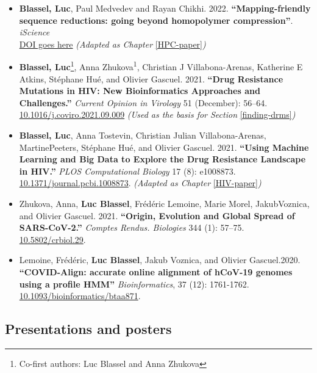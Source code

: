 \documentclass[
  11pt,
  twoside]{scrbook}
\begin{document}
\begin{itemize}
\item
  \textbf{Blassel, Luc}, Paul Medvedev and Rayan Chikhi. 2022. \textbf{``Mapping-friendly sequence reductions: going beyond homopolymer compression''}. \emph{iScience}\\
  \href{https://google.com}{DOI goes here} \emph{(Adapted as Chapter} \ref{HPC-paper}\emph{)}
\item
  \textbf{Blassel, Luc}\footnote{Co-first authors: Luc Blassel and Anna Zhukova}, Anna Zhukova\textsuperscript{1}, Christian J Villabona-Arenas, Katherine E Atkins, Stéphane Hué, and Olivier Gascuel. 2021. \textbf{``Drug Resistance Mutations in HIV: New Bioinformatics Approaches and Challenges.''} \emph{Current Opinion in Virology} 51 (December): 56--64.\\
  \href{https://doi.org/10.1016/j.coviro.2021.09.009}{10.1016/j.coviro.2021.09.009} \emph{(Used as the basis for Section} \ref{finding-drms}\emph{)}
\item
  \textbf{Blassel, Luc}, Anna Tostevin, Christian Julian Villabona-Arenas, MartinePeeters, Stéphane Hué, and Olivier Gascuel. 2021. \textbf{``Using Machine Learning and Big Data to Explore the Drug Resistance Landscape in HIV.''} \emph{PLOS Computational Biology} 17 (8): e1008873.\\
  \href{https://doi.org/10.1371/journal.pcbi.1008873}{10.1371/journal.pcbi.1008873}. \emph{(Adapted as Chapter} \ref{HIV-paper}\emph{)}
\item
  Zhukova, Anna, \textbf{Luc Blassel}, Frédéric Lemoine, Marie Morel, JakubVoznica, and Olivier Gascuel. 2021. \textbf{``Origin, Evolution and Global Spread of SARS-CoV-2.''} \emph{Comptes Rendus. Biologies} 344 (1): 57--75.\\
  \href{https://doi.org/10.5802/crbiol.29}{10.5802/crbiol.29}.
\item
  Lemoine, Frédéric, \textbf{Luc Blassel}, Jakub Voznica, and Olivier Gascuel.2020. \textbf{``COVID-Align: accurate online alignment of hCoV-19 genomes using a profile HMM''} \emph{Bioinformatics}, 37 (12): 1761-1762.\\
  \href{https://doi.org/10.1093/bioinformatics/btaa871}{10.1093/bioinformatics/btaa871}.
\end{itemize}

\hypertarget{presentations-and-posters}{%
\subsection*{Presentations and posters}\label{presentations-and-posters}}
\end{document}
